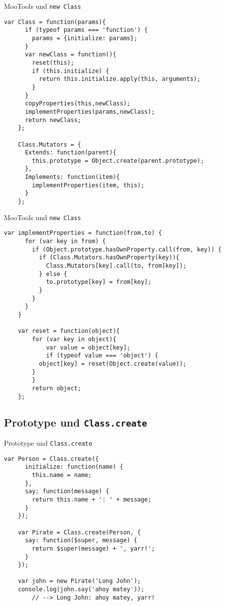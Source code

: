 \begin{frame}[fragile]{MooTools und \texttt{new Class}}
  \begin{lstlisting}[gobble=4]
    var Class = function(params){
      if (typeof params === 'function') {
        params = {initialize: params};
      }
      var newClass = function(){
        reset(this);
        if (this.initialize) {
          return this.initialize.apply(this, arguments);
        }
      }
      copyProperties(this,newClass);
      implementProperties(params,newClass);
      return newClass;
    };
    
    Class.Mutators = {
      Extends: function(parent){
        this.prototype = Object.create(parent.prototype);
      },
      Implements: function(item){
        implementProperties(item, this);
      }
    };
  \end{lstlisting}
\end{frame}

\begin{frame}[fragile]{MooTools und \texttt{new Class}}
  \begin{lstlisting}[gobble=4]
    var implementProperties = function(from,to) {
      for (var key in from) {
        if (Object.prototype.hasOwnProperty.call(from, key)) {
          if (Class.Mutators.hasOwnProperty(key)){
            Class.Mutators[key].call(to, from[key]);
          } else {
            to.prototype[key] = from[key];
          }
        }
      }
    }
    
    var reset = function(object){
    	for (var key in object){
    		var value = object[key]; 
    		if (typeof value === 'object') {
          object[key] = reset(Object.create(value));
        }
    	}
    	return object;
    };
  \end{lstlisting}
\end{frame}

\subsection{Prototype und \texttt{Class.create}}

\begin{frame}[fragile]{Prototype und \texttt{Class.create}}
  \begin{lstlisting}[gobble=4]
    var Person = Class.create({
      initialize: function(name) {
        this.name = name;
      },
      say: function(message) {
        return this.name + ': ' + message;
      }
    });
    
    var Pirate = Class.create(Person, {
      say: function($super, message) {
        return $super(message) + ', yarr!';
      }
    });
    
    var john = new Pirate('Long John');
    console.log(john.say('ahoy matey'));
        // --> Long John: ahoy matey, yarr!
  \end{lstlisting}
\end{frame}

